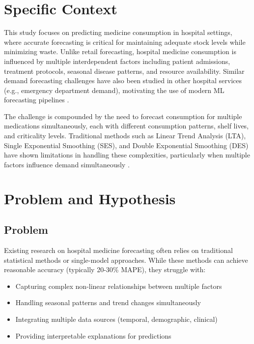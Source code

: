 \documentclass[conference]{IEEEtran}
\begin{document}
\section{Specific Context}

This study focuses on predicting medicine consumption in hospital settings, where accurate forecasting is critical for maintaining adequate stock levels while minimizing waste. Unlike retail forecasting, hospital medicine consumption is influenced by multiple interdependent factors including patient admissions, treatment protocols, seasonal disease patterns, and resource availability. Similar demand forecasting challenges have also been studied in other hospital services (e.g., emergency department demand), motivating the use of modern ML forecasting pipelines \cite{b20}.

The challenge is compounded by the need to forecast consumption for multiple medications simultaneously, each with different consumption patterns, shelf lives, and criticality levels. Traditional methods such as Linear Trend Analysis (LTA), Single Exponential Smoothing (SES), and Double Exponential Smoothing (DES) have shown limitations in handling these complexities, particularly when multiple factors influence demand simultaneously \cite{b1}.

\section{Problem and Hypothesis}

\subsection{Problem}

Existing research on hospital medicine forecasting often relies on traditional statistical methods or single-model approaches. While these methods can achieve reasonable accuracy (typically 20-30\% MAPE), they struggle with:

\begin{itemize}
    \item Capturing complex non-linear relationships between multiple factors
    \item Handling seasonal patterns and trend changes simultaneously
    \item Integrating multiple data sources (temporal, demographic, clinical)
    \item Providing interpretable explanations for predictions
\end{itemize}
\end{document}
